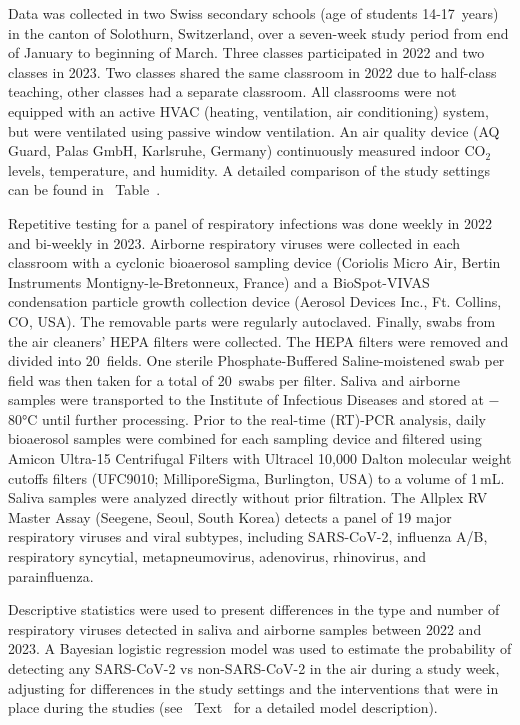 \documentclass[fleqn,11pt]{wlscirep}
\begin{document}
Data was collected in two Swiss secondary schools (age of students 14-17~years) in the canton of Solothurn, Switzerland, over a seven-week study period from end of January to beginning of March. Three classes participated in 2022 and two classes in 2023. Two classes shared the same classroom in 2022 due to half-class teaching, other classes had a separate classroom. All classrooms were not equipped with an active HVAC (heating, ventilation, air conditioning) system, but were ventilated using passive window ventilation. An air quality device (AQ Guard, Palas GmbH, Karlsruhe, Germany) continuously measured indoor CO$_2$ levels, temperature, and humidity. A detailed comparison of the study settings can be found in \supp~Table~. 

Repetitive testing for a panel of respiratory infections was done weekly in 2022 and bi-weekly in 2023. Airborne respiratory viruses were collected in each classroom with a cyclonic bioaerosol sampling device (Coriolis Micro Air, Bertin Instruments Montigny-le-Bretonneux, France) and a BioSpot-VIVAS condensation particle growth collection device (Aerosol Devices Inc., Ft. Collins, CO, USA)\cite{Lednicky2016AST}. The removable parts were regularly autoclaved. Finally, swabs from the air cleaners' HEPA filters were collected. The HEPA filters were removed and divided into 20~fields. One sterile Phosphate-Buffered Saline-moistened swab per field was then taken for a total of 20~swabs per filter. Saliva and airborne samples were transported to the Institute of Infectious Diseases and stored at $-$80°C until further processing\cite{Huber2021}. Prior to the real-time (RT)-PCR analysis, daily bioaerosol samples were combined for each sampling device and filtered using Amicon Ultra-15 Centrifugal Filters with Ultracel 10,000 Dalton molecular weight cutoffs filters (UFC9010; MilliporeSigma, Burlington, USA) to a volume of 1\,mL. Saliva samples were analyzed directly without prior filtration. The Allplex RV Master Assay (Seegene, Seoul, South Korea) detects a panel of 19 major respiratory viruses and viral subtypes, including SARS-CoV-2, influenza A/B, respiratory syncytial, metapneumovirus, adenovirus, rhinovirus, and parainfluenza. 

Descriptive statistics were used to present differences in the type and number of respiratory viruses detected in saliva and airborne samples between 2022 and 2023. A Bayesian logistic regression model was used to estimate the probability of detecting any SARS-CoV-2 vs non-SARS-CoV-2 in the air during a study week, adjusting for differences in the study settings and the interventions that were in place during the studies (see \supp~Text~ for a detailed model description).   
\end{document}
